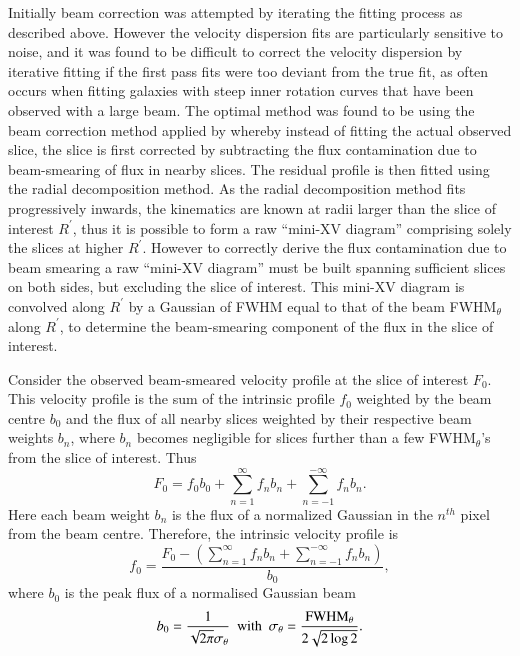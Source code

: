 \documentclass[traditabstract]{aa} %
\begin{document}
Initially beam correction was attempted by iterating the fitting
process as described above. However the velocity dispersion fits are
particularly sensitive to noise, and it was found to be difficult to
correct the velocity dispersion by iterative fitting if the first pass
fits were too deviant from the true fit, as often occurs when fitting
galaxies with steep inner rotation curves that have been observed with
a large beam.  The optimal method was found to be using the beam
correction method applied by \citet{kvdk2004} whereby instead of
fitting the actual observed slice, the slice is first corrected by
subtracting the flux contamination due to beam-smearing of flux in
nearby slices. The residual profile is then fitted using the radial
decomposition method. As the radial decomposition method fits
progressively inwards, the kinematics are known at radii larger than
the slice of interest $R^{\prime}$, thus it is possible to form a raw
``mini-XV diagram'' comprising solely the slices at higher $R^{\prime}$.
However to correctly derive the flux contamination due to beam
smearing a raw ``mini-XV diagram'' must be built spanning sufficient slices on
both sides, but excluding the slice of interest. This mini-XV diagram is
convolved along $R^{\prime}$ by a Gaussian of FWHM equal to that
of the beam FWHM$_{\theta}$ along $R^{\prime}$, to determine the
beam-smearing component of the flux in the slice of interest.


Consider the observed beam-smeared velocity profile at the slice of
interest $F_0$. This velocity profile is the sum of the 
intrinsic profile $f_0$
weighted by the beam centre $b_0$ and the flux of all nearby
slices weighted by their respective beam weights $b_n$, where $b_n$
becomes negligible for slices further than a few FWHM$_{\theta}$'s
from the slice of interest. Thus
\begin{equation}
  \label{ch4-beamconv-slice}
  F_0 = f_0 b_0 + \sum_{n=1}^{\infty} f_n b_n + \sum_{n=-1}^{-\infty}
  f_n b_n.
\end{equation}
Here each beam weight $b_n$ is the flux of a normalized Gaussian in
the $n^{th}$ pixel from the beam centre. Therefore, the intrinsic
velocity profile is
\begin{equation}
  \label{ch4-beamcorr-slice}
  f_0 = \frac{ F_0 - \left( \sum_{n=1}^{\infty} f_n b_n +
      \sum_{n=-1}^{-\infty} f_n b_n \right) }{b_0},
\end{equation}
where $b_0$ is the peak flux of a normalised Gaussian beam
\begin{equation}
  b_0 = \frac{1}{ \sqrt{2 \pi} \sigma_{\theta} } \ \ {\rm with}\ \ 
\sigma_{\theta} = \frac{{\rm FWHM}_{\theta}}{ 2 \sqrt{2\log{2}} }.
\end{equation}
\end{document}

